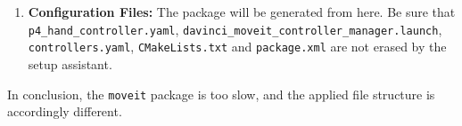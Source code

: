 \begin{enumerate}
\item \textbf{Configuration Files:} The package will be generated from here. Be sure that  \texttt{p4\_hand\_controller.yaml},  \texttt{davinci\_moveit\_controller\_manager.launch},
 \texttt{controllers.yaml}, \texttt{CMakeLists.txt} and \newline
 \texttt{package.xml} are not erased by the setup assistant. 
\end{enumerate}
%
%
In conclusion, the \texttt{moveit} package is too slow, and the applied file structure is accordingly different.

